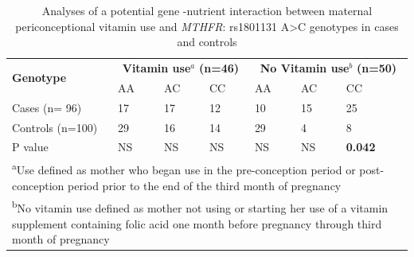 \begin{refsection}
\begin{table}[tb]
\centering
\caption{Analyses of a potential gene -nutrient interaction between maternal periconceptional vitamin use and \textit{MTHFR}: rs1801131 A>C genotypes in cases and controls}
\label{tab:6_10}
\begin{tabular}{ p{1.5in} p{0.5in} p{0.5in} p{0.5in} p{0.5in} p{0.5in} p{0.5in} }
\toprule
	 \multirow{2}{*}{\textbf{Genotype}} & \multicolumn{3}{c}{\textbf{Vitamin use$^a$}  %
	 \textbf{(n=46)}} & \multicolumn{3}{c}{\textbf{No Vitamin use$^b$}
	 \textbf{(n=50)}} \\ 
	 & AA & AC & CC & AA & AC & CC \\ \toprule
	Cases (n= 96) & 17 & 17 & 12 & 10 & 15 & 25 \\ \midrule
	Controls (n=100) & 29 & 16 & 14 & 29 & 4 & 8 \\ \midrule
	P value & NS & NS & NS & NS & NS & \textbf{0.042} \\ \bottomrule 


\multicolumn{7}{l}{\begin{minipage}{5.5in} \vspace{6pt}
\small \textsuperscript{a}Use defined as mother who began use in the pre-conception period or post-conception period prior to the end of the third month of pregnancy
\end{minipage}} \\


\multicolumn{7}{l}{\begin{minipage}{5.5in} \vspace{6pt}
\small \textsuperscript{b}No vitamin use defined as mother not using or starting her use of a vitamin supplement containing folic acid one month before pregnancy through third month of pregnancy
\end{minipage}}


\end{tabular}
\end{table}
\end{refsection}
